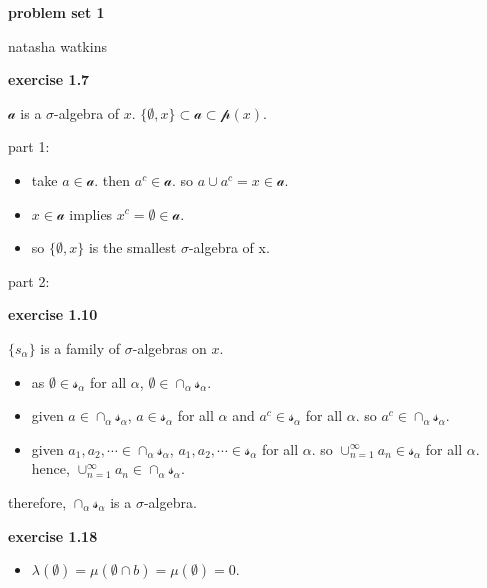 \documentclass[letterpaper,12pt]{article}
\begin{document}
\textbf{\large problem set 1}

natasha watkins

\vspace{5mm}

\noindent\textbf{exercise 1.7}

$\mathcal{a}$ is a $\sigma$-algebra of $x$. $\{\emptyset, x\} \subset \mathcal{a} \subset \mathcal{p}(x)$.

part 1:

\begin{itemize}
  \item take $a \in \mathcal{a}$. then $a^c \in \mathcal{a}$. so $a \cup a^c = x \in \mathcal{a}$.
  \item $x \in \mathcal{a}$ implies $x^c = \emptyset \in \mathcal{a}$.
  \item so $\{\emptyset, x\}$ is the smallest $\sigma$-algebra of x.
\end{itemize}

part 2:

\noindent\textbf{exercise 1.10}

$\{s_\alpha\}$ is a family of $\sigma$-algebras on $x$.

\begin{itemize}
  \item as $\emptyset \in \mathcal{s}_\alpha$ for all $\alpha$,
  $\emptyset \in \cap_\alpha \mathcal{s}_\alpha$.
  \item given $a \in \cap_\alpha \mathcal{s}_\alpha$, $a \in\mathcal{s}_\alpha$ for all $\alpha$ and $a^c \in \mathcal{s}_\alpha$ for all $\alpha$. so $a^c \in \cap_\alpha \mathcal{s}_\alpha$.
  \item given $a_1, a_2, \cdots \in \cap_\alpha \mathcal{s}_\alpha$, $a_1, a_2, \cdots \in \mathcal{s}_\alpha$ for all $\alpha$. so $\cup_{n=1}^\infty a_n \in \mathcal{s}_\alpha$ for all $\alpha$. hence, $\cup_{n=1}^\infty a_n \in \cap_\alpha \mathcal{s}_\alpha$.
\end{itemize}

therefore, $\cap_\alpha \mathcal{s}_\alpha$ is a $\sigma$-algebra.

\noindent\textbf{exercise 1.18}

\begin{itemize}
  \item $\lambda(\emptyset) = \mu(\emptyset \cap b) = \mu(\emptyset) = 0$.
\end{itemize}
\end{document}
